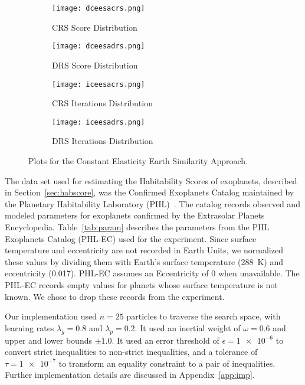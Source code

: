 \documentclass[10pt]{article}
\begin{document}
\begin{figure}
  \centering
  \begin{subfigure}[b]{0.38\textwidth}
    \texttt{[image: dceesacrs.png]}
    \caption{CRS Score Distribution}\label{fig:distcecrs}
  \end{subfigure}
  \quad
  \begin{subfigure}[b]{0.38\textwidth}
    \texttt{[image: dceesadrs.png]}
    \caption{DRS Score Distribution}\label{fig:distcedrs}
  \end{subfigure}

  \begin{subfigure}[b]{0.38\textwidth}
    \texttt{[image: iceesacrs.png]}
    \caption{CRS Iterations Distribution}\label{fig:itercecrs}
  \end{subfigure}
  \quad
  \begin{subfigure}[b]{0.38\textwidth}
    \texttt{[image: iceesadrs.png]}
    \caption{DRS Iterations Distribution}\label{fig:itercedrs}
  \end{subfigure}
  \caption{Plots for the Constant Elasticity Earth Similarity Approach.}\label{fig:ceesa}
\end{figure}


The data set used for estimating the Habitability Scores of exoplanets, described in Section~\ref{sec:habscore}, was the
Confirmed Exoplanets Catalog maintained by the Planetary Habitability Laboratory (PHL)~\cite{PHL}. The catalog records
observed and modeled parameters for exoplanets confirmed by the Extrasolar Planets Encyclopedia. Table~\ref{tab:param}
describes the parameters from the PHL Exoplanets Catalog (PHL-EC) used for the experiment. Since surface temperature and
eccentricity are not recorded in Earth Units, we normalized these values by dividing them with Earth's surface
temperature (\SI{288}{\kelvin}) and eccentricity (\num{0.017}). PHL-EC assumes an Eccentricity of 0 when unavailable.
The PHL-EC records empty values for planets whose surface temperature is not known. We chose to drop these records from
the experiment.

Our implementation used $n=25$ particles to traverse the search space, with learning rates $\lambda_g=0.8$ and
$\lambda_p=0.2$. It used an inertial weight of $\omega=0.6$ and upper and lower bounds $\pm1.0$. It used an error
threshold of $\epsilon=\num{1e-6}$ to convert strict inequalities to non-strict inequalities, and a tolerance of
$\tau=\num{1e-7}$ to transform an equality constraint to a pair of inequalities. Further implementation details are
discussed in Appendix~\ref{app:imp}.
\end{document}

